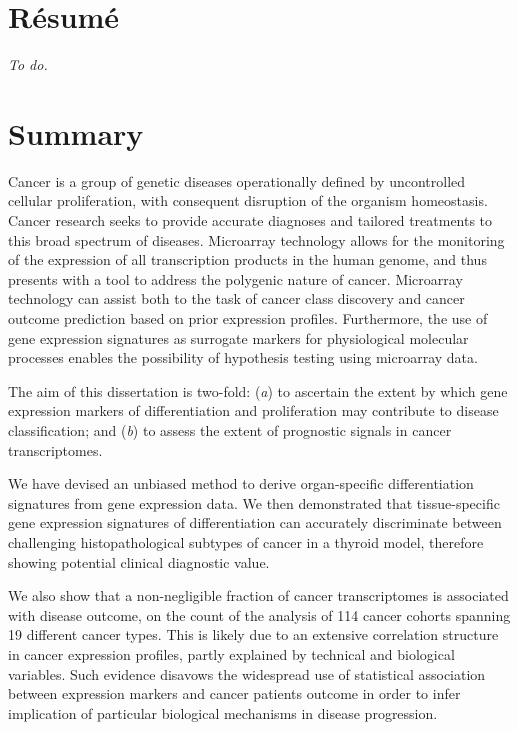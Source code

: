 \chapter*{Résumé}
\emph{To do.}
\clearpage
\blankpage
\chapter*{Summary}

Cancer is a group of genetic diseases operationally defined by uncontrolled
cellular proliferation, with consequent disruption of the organism
homeostasis.  Cancer research seeks to provide accurate diagnoses and tailored
treatments to this broad spectrum of diseases.  Microarray technology allows for
the monitoring of the expression of all transcription products in the human
genome, and thus presents with a tool to address the polygenic nature of cancer.
Microarray technology can assist both to the task of cancer class discovery and
cancer outcome prediction based on prior expression profiles.  Furthermore, the
use of gene expression signatures as surrogate markers for physiological
molecular processes enables the possibility of hypothesis testing using
microarray data.

The aim of this dissertation is two-fold: (\emph{a}) to ascertain the extent by
which gene expression markers of differentiation and proliferation may
contribute to disease classification; and (\emph{b}) to assess the extent of
prognostic signals in cancer transcriptomes.

We have devised an unbiased method to derive organ-specific differentiation
signatures from gene expression data.  We then demonstrated that tissue-specific
gene expression signatures of differentiation can accurately discriminate
between challenging histopathological subtypes of cancer in a thyroid model,
therefore showing potential clinical diagnostic value.

We also show that a non-negligible fraction of cancer transcriptomes is
associated with disease outcome, on the count of the analysis of 114 cancer
cohorts spanning 19 different cancer types.  This is likely due to an extensive
correlation structure in cancer expression profiles, partly explained by
technical and biological variables.  Such evidence disavows the widespread use
of statistical association between expression markers and cancer patients
outcome in order to infer implication of particular biological mechanisms in
disease progression.

